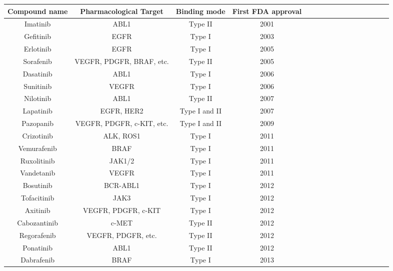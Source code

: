\documentclass[11pt, b5paper,twoside]{tesi_upf}
\newcommand\tr{\rule{0pt}{3.5ex}}
\newcommand\br{\rule[-3ex]{0pt}{3ex}}
\begin{document}
\renewcommand{\arraystretch}{1.2}
\begin{adjustbox}{max width=\textwidth}
\begin{threeparttable}[htbp]

 \centering

 \begin{tabular}{*{4}{|| c | c  |  c | c  ||}} 
 \hline
 \tr\textbf{Compound name}\br &\tr\textbf{Pharmacological Target}\br  & \tr\textbf{Binding mode}\br & \tr\textbf{First FDA approval}\br\\  

\hline
 Imatinib & ABL1 &  Type II   & 2001  \\  
\hline
 Gefitinib & EGFR &  Type I   & 2003  \\  
 \hline
 Erlotinib & EGFR &  Type I   & 2005  \\  
 \hline
 Sorafenib & VEGFR, PDGFR, BRAF, etc. & Type II & 2005  \\  
 \hline
 Dasatinib & ABL1 &  Type I   & 2006  \\ 
 \hline
 Sunitinib & VEGFR &  Type I   & 2006  \\
 \hline
 Nilotinib & ABL1 &  Type II   & 2007  \\ 
 \hline
 Lapatinib & EGFR, HER2 &  Type I and II   & 2007  \\  
  \hline
 Pazopanib & VEGFR, PDGFR, c-KIT, etc.&  Type I and II   & 2009  \\ 
 \hline
 Crizotinib & ALK, ROS1 &  Type I   & 2011  \\ 
 \hline
 Vemurafenib & BRAF &  Type I   & 2011  \\ 
 \hline
 Ruxolitinib & JAK1/2 &  Type I   & 2011  \\  
 \hline
 Vandetanib & VEGFR &  Type I   & 2011  \\ 
  \hline
 Bosutinib & BCR-ABL1 &  Type I   & 2012  \\ 
  \hline
 Tofacitinib & JAK3 &  Type I   & 2012  \\
  \hline
 Axitinib & VEGFR, PDGFR, c-KIT &  Type I   & 2012  \\ 
  \hline
 Cabozantinib & c-MET &  Type II   & 2012  \\  
  \hline
 Regorafenib & VEGFR, PDGFR, etc. &  Type II   & 2012  \\  
  \hline
 Ponatinib & ABL1 &  Type II   & 2012  \\   
  \hline
 Dabrafenib & BRAF &  Type I   & 2013  \\     

\end{tabular}
\end{threeparttable}
\end{adjustbox}
\end{document}
